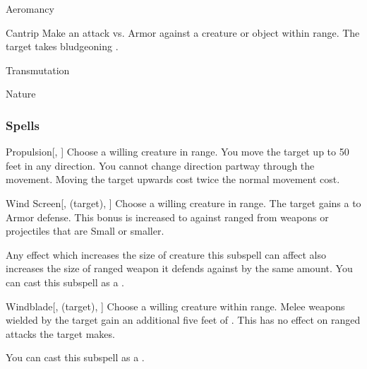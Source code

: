 
\begin{spellsection}{Aeromancy}

\begin{spellheader}
\end{spellheader}


\begin{ability}{Cantrip}
Make an attack vs. Armor against a creature or object within \rngmed range.
\hit The target takes bludgeoning .
\end{ability}




 Transmutation

 Nature
\end{spellsection}


\subsubsection{Spells}


\begin{ability}[\nth{1}]{Propulsion}[, ]
Choose a willing creature in \rngclose range.
You move the target up to 50 feet in any direction.
You cannot change direction partway through the movement.
Moving the target upwards cost twice the normal movement cost.
\end{ability}
\vspace{0.25em}



\begin{ability}[\nth{1}]{Wind Screen}[,  (target), ]
Choose a willing creature in \rngclose range.
The target gains a   to Armor defense.
This bonus is increased to  against ranged  from weapons or projectiles that are Small or smaller.

Any effect which increases the size of creature this subspell can affect also increases the size of ranged weapon it defends against by the same amount.
You can cast this subspell as a .
\end{ability}
\vspace{0.25em}



\begin{ability}[\nth{1}]{Windblade}[,  (target), ]
Choose a willing creature within \rngclose range.
Melee weapons wielded by the target gain an additional five feet of .
This has no effect on ranged attacks the target makes.

You can cast this subspell as a .
\end{ability}
\vspace{0.25em}



